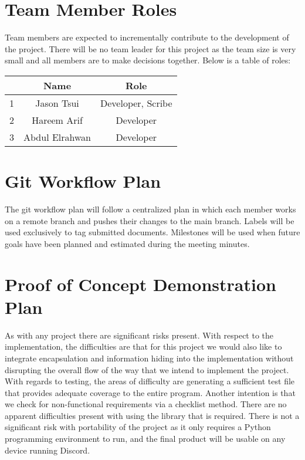 \documentclass[12pt]{article}
\begin{document}
\section{Team Member Roles}

\tab Team members are expected to incrementally contribute to the development of the project. There will be no team leader for this project as the team size is very small and all members are to make decisions together. Below is a table of roles:

\begin{center}
  \begin{tabular}{|c|c|c|}
  \hline
  &Name & Role \\ \hline
  1& Jason Tsui & Developer, Scribe\\ 
  2& Hareem Arif & Developer\\ 
  3&Abdul Elrahwan & Developer\\ \hline
\end{tabular}
\end{center}

\section{Git Workflow Plan}

\tab The git workflow plan will follow a centralized plan in which each member works on a remote branch and pushes their changes to the main branch. Labels will be used exclusively to tag submitted documents. Milestones will be used when future goals have been planned and estimated during the meeting minutes. 

\section{Proof of Concept Demonstration Plan}

\tab As with any project there are significant risks present. With respect to the implementation, the difficulties are that for this project we would also like to integrate encapsulation and information hiding into the implementation without disrupting the overall flow of the way that we intend to implement the project. With regards to testing, the areas of difficulty are generating a sufficient test file that provides adequate coverage to the entire program.  Another intention is that we check for non-functional requirements via a checklist method.  There are no apparent difficulties present with using the library that is required.  There is not a significant risk with portability of the project as it only requires a Python programming environment to run, and the final product will be usable on any device running Discord. 
\end{document}
